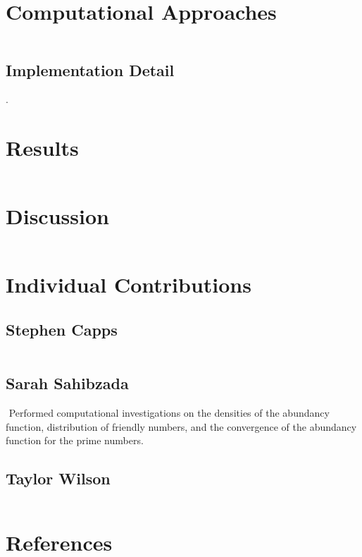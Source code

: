 \documentclass[11pt]{article}
\begin{document}
\section{Computational Approaches}$ $
\subsection{Implementation Detail}
.

\section{Results}$ $


\section{Discussion}$ $

\indent  
\section{Individual Contributions}
\subsection{Stephen Capps}$ $
\indent 
\subsection{Sarah Sahibzada}$ $
\indent Performed computational investigations on the densities of the abundancy function, distribution of friendly numbers, and the convergence of the abundancy function for the prime numbers. 
\subsection{Taylor Wilson}$ $
\indent 

\newpage
\section{References}
\end{document}
